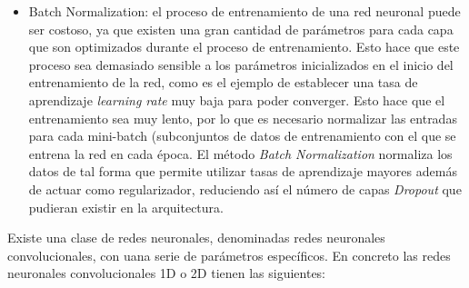 \begin{itemize}
                \item Batch Normalization: el proceso de entrenamiento de una red neuronal puede ser costoso, ya que existen una gran cantidad de parámetros para cada capa que son optimizados durante el proceso de entrenamiento. Esto hace que este proceso sea demasiado sensible a los parámetros inicializados en el inicio del entrenamiento de la red, como es el ejemplo de establecer una tasa de aprendizaje \textit{learning rate} muy baja para poder converger. Esto hace que el entrenamiento sea muy lento, por lo que es necesario normalizar las entradas para cada mini-batch (subconjuntos de datos de entrenamiento con el que se entrena la red en cada época. El método \textit{Batch Normalization} \cite{BatchNormalization} normaliza los datos de tal forma que permite utilizar tasas de aprendizaje mayores además de actuar como regularizador, reduciendo así el número de capas \textit{Dropout} que pudieran existir en la arquitectura.

            \end{itemize}

            Existe una clase de redes neuronales, denominadas redes neuronales convolucionales, con uana serie de parámetros específicos. En concreto las redes neuronales convolucionales 1D o 2D tienen las siguientes:

